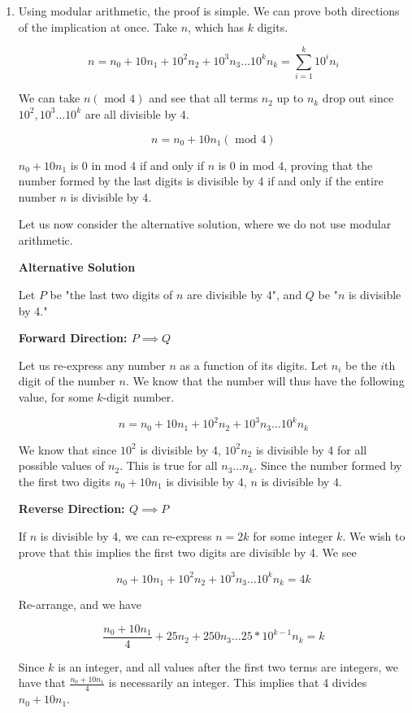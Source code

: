 \begin{solution}

\begin{enumerate}
\item Using modular arithmetic, the proof is simple. We can prove both directions
of the implication at once. Take $n$, which has $k$ digits.

$$n = n_0 + 10 n_1 + 10^2 n_2 + 10^3 n_3 \dots 10^k n_k = \sum_{i=1}^k 10^i n_i$$

We can take $n (\text{ mod } 4)$ and see that all terms $n_2$ up to $n_k$ drop
out since $10^2, 10^3 \dots 10^k$ are all divisible by 4.

$$n = n_0 + 10 n_1 (\text{ mod } 4)$$

$n_0 + 10n_1$ is 0 in mod 4 if and only if $n$ is 0 in mod 4, proving that
the number formed by the last digits is divisible by 4 if and only if
the entire number $n$ is divisible by 4.

Let us now consider the alternative solution, where we do not use modular
arithmetic.

\textbf{Alternative Solution}

Let $P$ be "the last two digits of $n$ are divisible by 4", and $Q$ be
"$n$ is divisible by 4."

\textbf{Forward Direction: $P \implies Q$}

Let us re-express any number $n$ as a function of its digits. Let $n_i$
be the $i$th digit of the number $n$. We know that the number will thus have
the following value, for some $k$-digit number.

$$n = n_0 + 10 n_1 + 10^2 n_2 + 10^3 n_3 \dots 10^k n_k$$

We know that since $10^2$ is divisible by 4, $10^2 n_2$ is divisible by 4 for all
possible values of $n_2$. This is true for all $n_3 \dots n_k$. Since the number
formed by the first two digits $n_0 + 10n_1$ is divisible by 4, $n$ is
divisible by 4.

\textbf{Reverse Direction: $Q \implies P$}

If $n$ is divisible by 4, we can re-express $n = 2k$ for some integer $k$. We
wish to prove that this implies the first two digits are divisible by 4. We see

$$n_0 + 10 n_1 + 10^2 n_2 + 10^3 n_3 \dots 10^k n_k = 4k$$

Re-arrange, and we have

$$\frac{n_0 + 10 n_1}{4} + 25 n_2 + 250 n_3 \dots 25 * 10^{k-1} n_k = k$$

Since $k$ is an integer, and all values after the first two terms are integers,
we have that $\frac{n_0 + 10 n_1}{4}$ is necessarily an integer. This
implies that 4 divides $n_0 + 10 n_1$.


\end{enumerate}
\end{solution}
